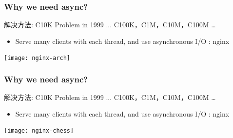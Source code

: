 \begin{frame}[fragile]	
	\frametitle{Why we need async?}
	
	解决方法: C10K Problem in 1999 ... C100K，C1M，C10M，C100M …
	\begin{itemize}
		\item Serve many clients with each thread, and use asynchronous I/O  : nginx
		
		
	\end{itemize}	
	
	\centering
	
	   
	\texttt{[image: nginx-arch]}
\end{frame}
\begin{frame}[fragile]	
    \frametitle{Why we need async?}
    
    解决方法: C10K Problem in 1999 ... C100K，C1M，C10M，C100M …
    \begin{itemize}
        \item Serve many clients with each thread, and use asynchronous I/O  : nginx
        
        
    \end{itemize}	
    
    \centering
    
    
    \texttt{[image: nginx-chess]}
\end{frame}


